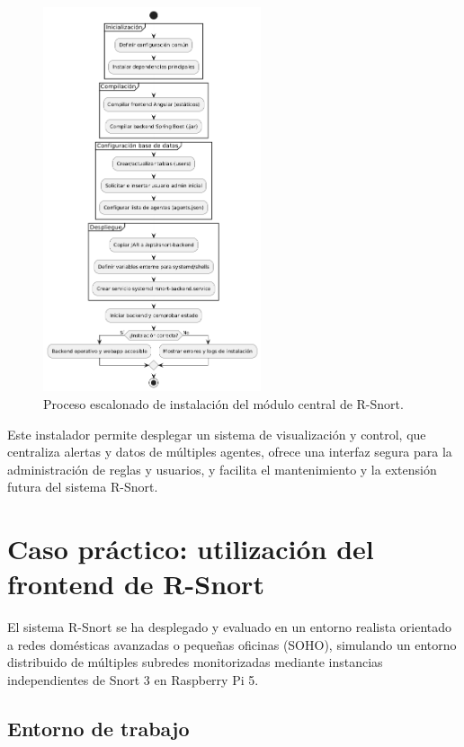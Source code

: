 \documentclass[11pt,a4paper,twoside]{report}
\begin{document}
\begin{figure}[H]
	\centering
	\includegraphics[width=0.57\textwidth]{documento/30.png}
	\caption{Proceso escalonado de instalación del módulo central de R-Snort.}
	\label{fig:bpmn-snort-central}
\end{figure}

Este instalador permite desplegar un sistema de visualización y control, que centraliza alertas y datos de múltiples agentes, ofrece una interfaz segura para la administración de reglas y usuarios, y facilita el mantenimiento y la extensión futura del sistema R-Snort.

\chapter{Caso práctico: utilización del frontend de R-Snort}

El sistema R-Snort se ha desplegado y evaluado en un entorno realista orientado a redes domésticas avanzadas o pequeñas oficinas (SOHO), simulando un entorno distribuido de múltiples subredes monitorizadas mediante instancias independientes de Snort 3 en Raspberry Pi 5.

\section{Entorno de trabajo}
\end{document}
